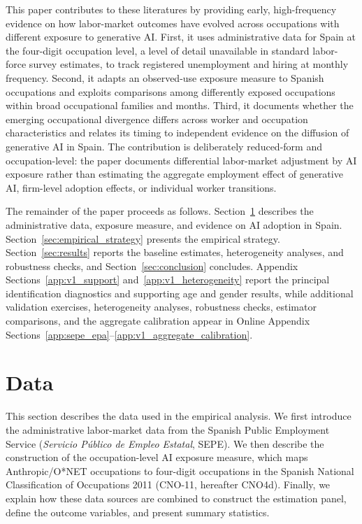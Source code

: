 This paper contributes to these literatures by providing early, high-frequency evidence on how labor-market outcomes have evolved across occupations with different exposure to generative AI. First, it uses administrative data for Spain at the four-digit occupation level, a level of detail unavailable in standard labor-force survey estimates, to track registered unemployment and hiring at monthly frequency. Second, it adapts an observed-use exposure measure to Spanish occupations and exploits comparisons among differently exposed occupations within broad occupational families and months. Third, it documents whether the emerging occupational divergence differs across worker and occupation characteristics and relates its timing to independent evidence on the diffusion of generative AI in Spain. The contribution is deliberately reduced-form and occupation-level: the paper documents differential labor-market adjustment by AI exposure rather than estimating the aggregate employment effect of generative AI, firm-level adoption effects, or individual worker transitions.

The remainder of the paper proceeds as follows. Section~\ref{sec:data} describes the administrative data, exposure measure, and evidence on AI adoption in Spain. Section~\ref{sec:empirical_strategy} presents the empirical strategy. Section~\ref{sec:results} reports the baseline estimates, heterogeneity analyses, and robustness checks, and Section~\ref{sec:conclusion} concludes. Appendix Sections~\ref{app:v1_support} and~\ref{app:v1_heterogeneity} report the principal identification diagnostics and supporting age and gender results, while additional validation exercises, heterogeneity analyses, robustness checks, estimator comparisons, and the aggregate calibration appear in Online Appendix Sections~\ref{app:sepe_epa}--\ref{app:v1_aggregate_calibration}.

\section{Data}
\label{sec:data}

This section describes the data used in the empirical analysis. We first introduce the administrative labor-market data from the Spanish Public Employment Service (\textit{Servicio P\'ublico de Empleo Estatal}, SEPE). We then describe the construction of the occupation-level AI exposure measure, which maps Anthropic/O*NET occupations to four-digit occupations in the Spanish National Classification of Occupations 2011 (CNO-11, hereafter CNO4d). Finally, we explain how these data sources are combined to construct the estimation panel, define the outcome variables, and present summary statistics.


